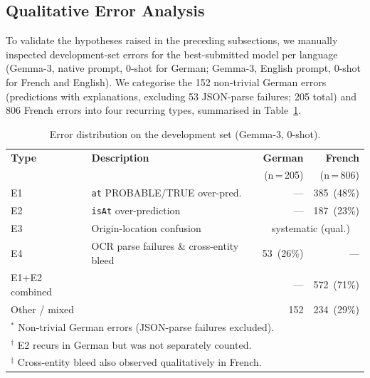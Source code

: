 \documentclass[
]{ceurart}
\theoremstyle{definition}
\begin{document}
\subsection{Qualitative Error Analysis}
\label{sec:error-analysis}

To validate the hypotheses raised in the preceding subsections, we manually inspected development-set errors for the best-submitted model per language (Gemma-3, native prompt, 0-shot for German; Gemma-3, English prompt, 0-shot for French and English).
We categorise the 152 non-trivial German errors (predictions with explanations, excluding 53 JSON-parse failures; 205 total) and 806 French errors into four recurring types, summarised in Table~\ref{tab:errors}.

\begin{table}[t]
\centering
\caption{Error distribution on the development set (Gemma-3, 0-shot).}
\label{tab:errors}
\setlength{\tabcolsep}{4pt}
\begin{tabular}{llrr}
\toprule
\textbf{Type} & \textbf{Description} & \textbf{German} & \textbf{French} \\
              &                      & (n\,=\,205)     & (n\,=\,806)     \\
\midrule
E1 & \texttt{at} PROBABLE/TRUE over-pred.    & ---          & 385~(48\%) \\
E2 & \texttt{isAt} over-prediction           & ---\rlap{$^\dagger$} & 187~(23\%) \\
E3 & Origin-location confusion               & \multicolumn{2}{c}{systematic (qual.)} \\
E4 & OCR parse failures \& cross-entity bleed & 53~(26\%)  & ---\rlap{$^\ddagger$} \\
\midrule
E1+E2 combined                               &              & ---      & 572~(71\%) \\
Other / mixed                                &              & 152\rlap{$^*$}  & 234~(29\%) \\
\bottomrule
\multicolumn{4}{l}{\scriptsize $^*$ Non-trivial German errors (JSON-parse failures excluded).}\\
\multicolumn{4}{l}{\scriptsize $^\dagger$ E2 recurs in German but was not separately counted.}\\
\multicolumn{4}{l}{\scriptsize $^\ddagger$ Cross-entity bleed also observed qualitatively in French.}\\
\end{tabular}
\end{table}
\end{document}
